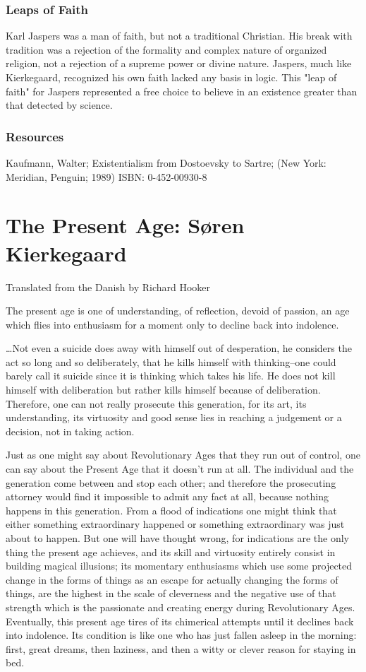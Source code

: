 \documentclass[12pt]{article}
\begin{document}
\subsubsection{Leaps of Faith}
Karl Jaspers was a man of faith, but not a traditional Christian. His break with tradition was a rejection of the formality and
complex nature of organized religion, not a rejection of a supreme power or divine nature. Jaspers, much like Kierkegaard,
recognized his own faith lacked any basis in logic. This "leap of faith" for Jaspers represented a free choice to believe in an
existence greater than that detected by science. 

\subsubsection*{Resources}
Kaufmann, Walter; Existentialism from Dostoevsky to Sartre; (New York: Meridian, Penguin; 1989) ISBN: 0-452-00930-8 

\section{The Present Age: S{\o}ren Kierkegaard}
Translated from the Danish by Richard Hooker


    The present age is one of understanding, of reflection, devoid of
passion, an age which flies into enthusiasm for a moment only to decline
back into indolence.

   \ldots Not even a suicide does away with himself out of desperation,
he considers the act so long and so deliberately, that he kills himself with
thinking--one could barely call it suicide since it is thinking which takes
his life. He does not kill himself with deliberation but rather kills
himself because of deliberation. Therefore, one can not really prosecute
this generation, for its art, its understanding, its virtuosity and good
sense lies in reaching a judgement or a decision, not in taking action.

   Just as one might say about Revolutionary Ages that they run out of
control, one can say about the Present Age that it doesn't run at all. The
individual and the generation come between and stop each other; and
therefore the prosecuting attorney would find it impossible to admit any
fact at all, because nothing happens in this generation. From a flood of
indications one might think that either something extraordinary happened or
something extraordinary was just about to happen. But one will have thought
wrong, for indications are the only thing the present age achieves, and its
skill and virtuosity entirely consist in building magical illusions; its
momentary enthusiasms which use some projected change in the forms of things
as an escape for actually changing the forms of things, are the highest in
the scale of cleverness and the negative use of that strength which is the
passionate and creating energy during Revolutionary Ages. Eventually, this
present age tires of its chimerical attempts until it declines back into
indolence. Its condition is like one who has just fallen asleep in the
morning: first, great dreams, then laziness, and then a witty or clever
reason for staying in bed.
\end{document}
